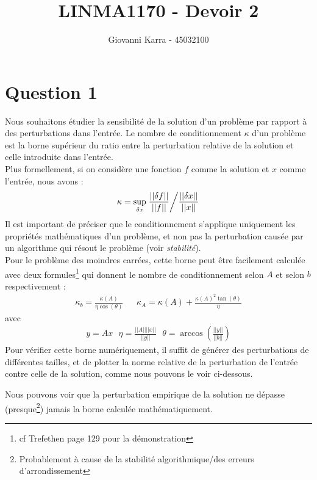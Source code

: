 \documentclass[11pt]{article}
\title{LINMA1170 - Devoir 2}
\author{Giovanni Karra - 45032100}
\begin{document}
\maketitle

\section*{Question 1}
Nous souhaitons étudier la sensibilité de la solution d'un problème par rapport à des perturbations dans l'entrée. Le nombre de conditionnement $\kappa$ d'un problème est la borne supérieur du ratio entre la perturbation relative de la solution et celle introduite dans l'entrée. \\
Plus formellement, si on considère une fonction $f$ comme la solution et $x$ comme l'entrée, nous avons :
\begin{align}
    \kappa = \sup_{\delta x}\left. \frac{||\delta f||}{||f||} \middle/ \frac{||\delta x||}{||x||} \right.
\end{align}
Il est important de préciser que le conditionnement s'applique uniquement les propriétés mathématiques d'un problème, et non pas la perturbation causée par un algorithme qui résout le problème (voir \textit{stabilité}).\\
Pour le problème des moindres carrées, cette borne peut être facilement calculée avec deux formules\footnote{cf Trefethen page 129 pour la démonstration} qui donnent le nombre de conditionnement selon $A$ et selon $b$ respectivement :
\begin{align}
    \kappa_b = \frac{\kappa(A)}{\eta \cos(\theta)}~~~~~~~\kappa_A = \kappa(A) + \frac{\kappa(A)^2\tan(\theta)}{\eta}
\end{align}
avec
\begin{align}
    y = Ax ~~~ \eta = \frac{||A||||x||}{||y||} ~~~
    \theta = \arccos\left(\frac{||y||}{||b||}\right)
\end{align}
Pour vérifier cette borne numériquement, il suffit de générer des perturbations de différentes tailles, et de plotter la norme relative de la perturbation de l'entrée contre celle de la solution, comme nous pouvons le voir ci-dessous.
\begin{figure}[H]
    \centering
    
    
    
    
\end{figure}
Nous pouvons voir que la perturbation empirique de la solution ne dépasse (presque\footnote{Probablement à cause de la stabilité algorithmique/des erreurs d'arrondissement}) jamais la borne calculée mathématiquement.
\end{document}
